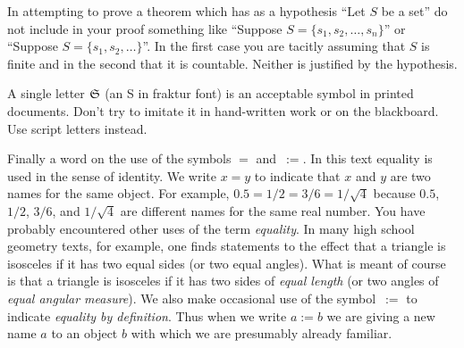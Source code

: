 \begin{cau} In attempting to prove a theorem which has as a hypothesis ``Let
$S$ be a set'' do not include in your proof something like ``Suppose $S = \{s_1, s_2, \dots,
s_n\}$'' or ``Suppose $S = \{s_1, s_2, \dots\}$''.  In the first case you are tacitly assuming
that $S$ is finite and in the second that it is countable. Neither is justified by the
hypothesis.
\end{cau}



\begin{cau} A single letter $\mathfrak{S}$ (an S in fraktur font) is an acceptable symbol
in printed documents. Don't try to imitate it in hand-written work or on the blackboard.  Use
script letters instead.
\end{cau}






Finally a word on the use of the symbols $=$ and~$:=$.  In this text
equality is used in the sense of identity.  We write $x = y$ to indicate that $x$ and $y$ are
two names for the same object.  For example, $0.5 = 1/2 = 3/6 = 1/\sqrt 4$ because $0.5$,
$1/2$, $3/6$, and $1/\sqrt 4$ are different names for the same real number.  You have probably
encountered other uses of the term \emph{equality}. In many high school geometry texts, for
example, one finds statements to the effect that a triangle is isosceles if it has two equal
sides (or two equal angles).  What is meant of course is that a triangle is isosceles if it
has two sides of \emph{equal length} (or two angles of \emph{equal angular measure}).  We also
make occasional use of the
symbol~$:=$ to indicate \emph{equality by definition}.  Thus when we write $a := b$ we are
giving a new name $a$ to an object $b$ with which we are presumably already familiar.

 \endinput
